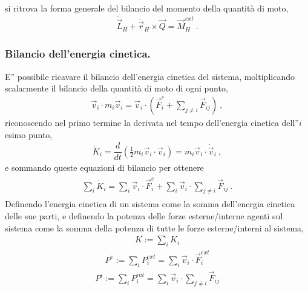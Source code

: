 \documentclass[letterpaper,10pt,italian]{jupyterBook}
\begin{document}
\sphinxAtStartPar
si ritrova la forma generale del bilancio del momento della quantità di moto,
\begin{equation*}
\begin{split}\dot{\vec{L}}_{H} + \dot{\vec{r}}_H \times \vec{Q} = \vec{M}_H^{ext} \ .\end{split}
\end{equation*}\subsubsection*{Bilancio dell’energia cinetica.}

\sphinxAtStartPar
E” possibile ricavare il bilancio dell’energia cinetica del sistema, moltiplicando scalarmente il bilancio della quantità di moto di ogni punto,
\begin{equation*}
\begin{split}\vec{v}_i \cdot m_i \dot{\vec{v}}_i = \vec{v}_i \cdot \left( \vec{F}_i^{e} + \sum_{j \ne i} \vec{F}_{ij} \right) \ ,\end{split}
\end{equation*}
\sphinxAtStartPar
riconoscendo nel primo termine la derivata nel tempo dell’energia cinetica dell”\(i\)\sphinxhyphen{}esimo punto,
\begin{equation*}
\begin{split}\dot{K}_i = \dfrac{d}{dt} \left( \frac{1}{2} m_i \vec{v}_i \cdot \vec{v}_i \right) = m_i \vec{v}_i \cdot \dot{\vec{v}}_i \ ,\end{split}
\end{equation*}
\sphinxAtStartPar
e sommando queste equazioni di bilancio per ottenere
\begin{equation*}
\begin{split}\begin{aligned}
  \sum_i \dot{K}_i = \sum_i \vec{v}_i \cdot  \vec{F}_i^{e} + \sum_i \vec{v}_i \cdot \sum_{j \ne i} \vec{F}_{ij} \ . 
\end{aligned}\end{split}
\end{equation*}
\sphinxAtStartPar
Definendo l’energia cinetica di un sistema come la somma dell’energia cinetica delle sue parti, e definendo la potenza delle forze esterne/interne agenti sul sistema come la somma della potenza di tutte le forze esterne/interni al sistema,
\begin{equation*}
\begin{split}K :=  \sum_i K_i\end{split}
\end{equation*}\begin{equation*}
\begin{split}P^e := \sum_i P^{ext}_i = \sum_i \vec{v}_i \cdot  \vec{F}_i^{ext} \end{split}
\end{equation*}\begin{equation*}
\begin{split}P^i := \sum_i P^{int}_i = \sum_i \vec{v}_i \cdot \sum_{j \ne i} \vec{F}_{ij}\end{split}
\end{equation*}
\end{document}
